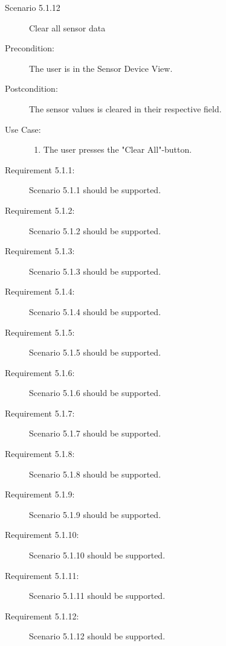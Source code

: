 \documentclass[a4paper]{article}
\begin{document}
\begin{description}
\item[Scenario 5.1.12] Clear all sensor data
\item[Precondition:] The user is in the Sensor Device View.
\item[Postcondition:] The sensor values is cleared in their respective field.
\item[Use Case:]\mbox{}
\begin{enumerate}
\item \label{7} The user presses the "Clear All"-button.
\end{enumerate}

\item[Requirement 5.1.1:] Scenario 5.1.1 should be supported.
\item[Requirement 5.1.2:] Scenario 5.1.2 should be supported.
\item[Requirement 5.1.3:] Scenario 5.1.3 should be supported.
\item[Requirement 5.1.4:] Scenario 5.1.4 should be supported.
\item[Requirement 5.1.5:] Scenario 5.1.5 should be supported.
\item[Requirement 5.1.6:] Scenario 5.1.6 should be supported.
\item[Requirement 5.1.7:] Scenario 5.1.7 should be supported.
\item[Requirement 5.1.8:] Scenario 5.1.8 should be supported.
\item[Requirement 5.1.9:] Scenario 5.1.9 should be supported.
\item[Requirement 5.1.10:] Scenario 5.1.10 should be supported.
\item[Requirement 5.1.11:] Scenario 5.1.11 should be supported.
\item[Requirement 5.1.12:] Scenario 5.1.12 should be supported.

\end{description}
\end{document}
